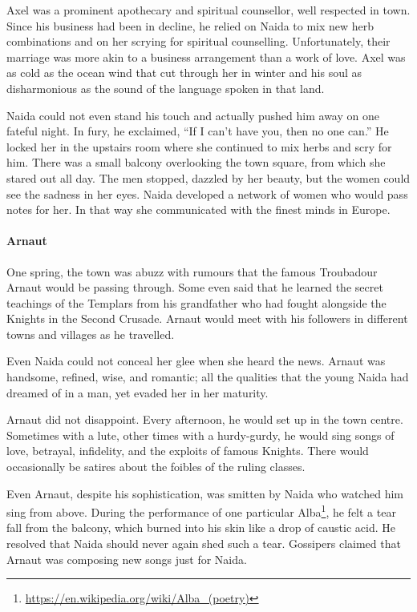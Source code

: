 Axel was a prominent apothecary and spiritual counsellor, well respected in town. Since his business had been in decline, he relied on Naida to mix new herb combinations and on her scrying for spiritual counselling. Unfortunately, their marriage was more akin to a business arrangement than a work of love. Axel was as cold as the ocean wind that cut through her in winter and his soul as disharmonious as the sound of the language spoken in that land.

Naida could not even stand his touch and actually pushed him away on one fateful night. In fury, he exclaimed, ``If I can't have you, then no one can.'' He locked her in the upstairs room where she continued to mix herbs and scry for him. There was a small balcony overlooking the town square, from which she stared out all day. The men stopped, dazzled by her beauty, but the women could see the sadness in her eyes. Naida developed a network of women who would pass notes for her. In that way she communicated with the finest minds in Europe.

\paragraph{Arnaut}


One spring, the town was abuzz with rumours that the famous Troubadour Arnaut would be passing through. Some even said that he learned the secret teachings of the Templars from his grandfather who had fought alongside the Knights in the Second Crusade. Arnaut would meet with his followers in different towns and villages as he travelled.

Even Naida could not conceal her glee when she heard the news. Arnaut was handsome, refined, wise, and romantic; all the qualities that the young Naida had dreamed of in a man, yet evaded her in her maturity.

Arnaut did not disappoint. Every afternoon, he would set up in the town centre. Sometimes with a lute, other times with a hurdy-gurdy, he would sing songs of love, betrayal, infidelity, and the exploits of famous Knights. There would occasionally be satires about the foibles of the ruling classes.

Even Arnaut, despite his sophistication, was smitten by Naida who watched him sing from above. During the performance of one particular Alba\footnote{\url{https://en.wikipedia.org/wiki/Alba\_(poetry)}}, he felt a tear fall from the balcony, which burned into his skin like a drop of caustic acid. He resolved that Naida should never again shed such a tear. Gossipers claimed that Arnaut was composing new songs just for Naida.

